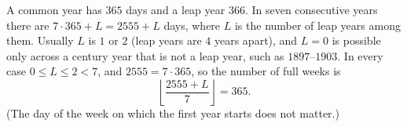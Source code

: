 A common year has $365$ days and a leap year $366$. In seven consecutive years there are $7\cdot365+L=2555+L$ days, where $L$ is the number of leap years among them. Usually $L$ is $1$ or $2$ (leap years are $4$ years apart), and $L=0$ is possible only across a century year that is not a leap year, such as $1897$--$1903$. In every case $0\le L\le2<7$, and $2555=7\cdot365$, so the number of full weeks is
\[
\left\lfloor\dfrac{2555+L}{7}\right\rfloor=\boxed{365}.
\]
(The day of the week on which the first year starts does not matter.)
